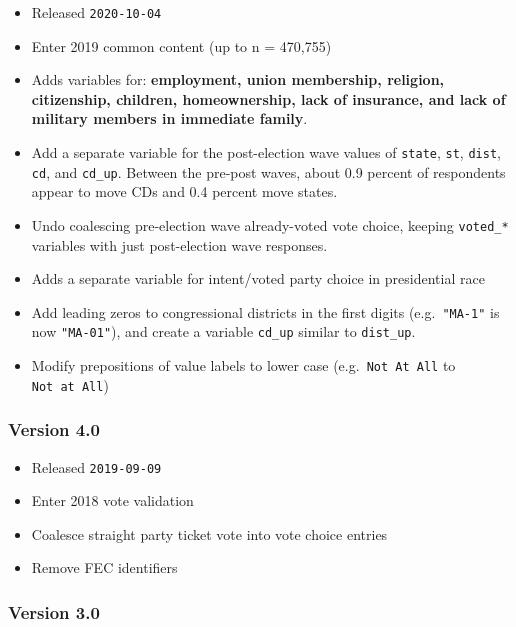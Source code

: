 \documentclass[10pt,article,oneside]{memoir}
\theoremstyle{definition}
\begin{document}
\begin{itemize}
\tightlist
\item
  Released \texttt{2020-10-04}
\item
  Enter 2019 common content (up to n = 470,755)
\item
  Adds variables for: \textbf{employment, union membership, religion,
  citizenship, children, homeownership, lack of insurance, and lack of
  military members in immediate family}.
\item
  Add a separate variable for the post-election wave values of
  \texttt{state}, \texttt{st}, \texttt{dist}, \texttt{cd}, and
  \texttt{cd\_up}. Between the pre-post waves, about 0.9 percent of
  respondents appear to move CDs and 0.4 percent move states.
\item
  Undo coalescing pre-election wave already-voted vote choice, keeping
  \texttt{voted\_*} variables with just post-election wave responses.
\item
  Adds a separate variable for intent/voted party choice in presidential
  race
\item
  Add leading zeros to congressional districts in the first digits
  (e.g.~\texttt{"MA-1"} is now \texttt{"MA-01"}), and create a variable
  \texttt{cd\_up} similar to \texttt{dist\_up}.
\item
  Modify prepositions of value labels to lower case
  (e.g.~\texttt{Not\ At\ All} to \texttt{Not\ at\ All})
\end{itemize}

\hypertarget{version-4.0}{%
\subsubsection{Version 4.0}\label{version-4.0}}

\begin{itemize}
\tightlist
\item
  Released \texttt{2019-09-09}
\item
  Enter 2018 vote validation
\item
  Coalesce straight party ticket vote into vote choice entries
\item
  Remove FEC identifiers
\end{itemize}

\hypertarget{version-3.0}{%
\subsubsection{Version 3.0}\label{version-3.0}}
\end{document}
